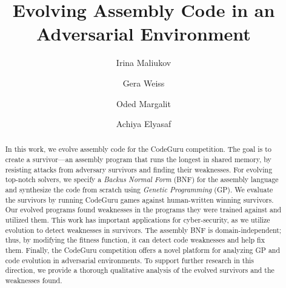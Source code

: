 \documentclass[dvipsnames, format=sigconf]{acmart}
\begin{document}
\title{Evolving Assembly Code in an Adversarial Environment}

\author{Irina Maliukov}
\author{Gera Weiss}
\author{Oded Margalit}

\author{Achiya Elyasaf}

\renewcommand{\shortauthors}{Maliukov et al.}

\begin{abstract}
In this work, we evolve assembly code for the CodeGuru competition. The goal is to create a survivor---an assembly program that runs the longest in shared memory, by resisting attacks from adversary survivors and finding their weaknesses.
For evolving top-notch solvers, we specify a \textit{Backus Normal Form} (BNF) for the assembly language and synthesize the code from scratch using \textit{Genetic Programming} (GP). We evaluate the survivors by running CodeGuru games against human-written winning survivors. 
Our evolved programs found weaknesses in the programs they were trained against and utilized them.
This work has important applications for cyber-security, as we utilize evolution to detect weaknesses in survivors. The assembly BNF is domain-independent; thus, by modifying the fitness function, it can detect code weaknesses and help fix them. 
Finally, the CodeGuru competition offers a novel platform for analyzing GP and code evolution in adversarial environments. To support further research in this direction, we provide a thorough qualitative analysis of the evolved survivors and the weaknesses found.
\end{abstract}
\end{document}
